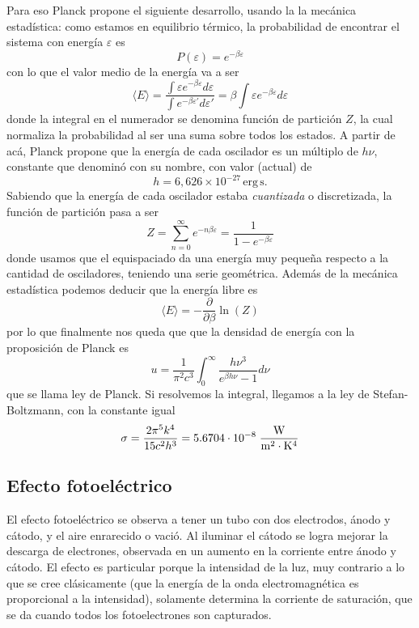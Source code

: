 Para eso Planck propone el siguiente desarrollo, usando la la mecánica estadística: 
como estamos en equilibrio térmico, la probabilidad de encontrar el sistema con energía $\varepsilon$ es 
\[ P(\varepsilon) = e^{-\beta \varepsilon}\]
con lo que el valor medio de la energía va a ser
\[ \langle E \rangle = \frac{\int \varepsilon e^{-\beta \varepsilon} d\varepsilon}{\int e^{-\beta \varepsilon'} d\varepsilon'} = \beta \int \varepsilon e^{-\beta \varepsilon} d\varepsilon\]
donde la integral en el numerador se denomina función de partición $Z$, la cual normaliza la probabilidad al ser una suma sobre todos los estados.
A partir de acá, Planck propone que la energía de cada oscilador es un múltiplo de $h\nu$, constante que denominó con su nombre, con valor (actual) de
\begin{equation}
h = 6,626 \times 10^{-27}\,\text{erg}\,\text{s}.
\end{equation}
Sabiendo que la energía de cada oscilador estaba \emph{cuantizada} o discretizada, la función de partición pasa a ser
\[ Z = \sum^\infty_{n = 0} e^{-n \beta \varepsilon} = \frac{1}{1 - e^{-\beta \varepsilon}}\]
donde usamos que el equispaciado da una energía muy pequeña respecto a la cantidad de osciladores, teniendo una serie geométrica. 
Además de la mecánica estadística podemos deducir que la energía libre es
\begin{equation}
    \langle E \rangle = - \frac{\partial}{\partial \beta} \ln(Z)
\end{equation}
por lo que finalmente nos queda que que la densidad de energía con la proposición de Planck es
\begin{equation}
  u = \frac{1}{\pi^2 c^3} \int^\infty_0 \frac{h \nu^3}{e^{\beta h \nu} - 1} d\nu
\end{equation}
que se llama ley de Planck.
Si resolvemos la integral, llegamos a la ley  de Stefan-Boltzmann, con la constante igual 
\begin{equation}
\sigma=\frac{2\pi^5 k^4}{15c^2h^3}= 5.6704 \cdot 10^{-8}\; \rm\frac {W}{m^2 \cdot K^4}
\end{equation}
\subsection{Efecto fotoeléctrico}

El efecto fotoeléctrico se observa a tener un tubo con dos electrodos, ánodo y cátodo, y el aire enrarecido o vació. Al iluminar el cátodo se logra mejorar la descarga de electrones, observada en un aumento en la corriente entre ánodo y cátodo.
El efecto es particular porque la intensidad de la luz, muy contrario a lo que se cree clásicamente (que la energía de la onda electromagnética es proporcional a la intensidad), solamente determina la corriente de saturación, que se da cuando todos los fotoelectrones son capturados.


